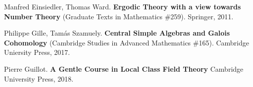 \documentclass[12pt]{article}
\begin{document}
\vfill
\begin{thebibliography}{} 

\item Manfred Einsiedler, Thomas Ward.  \textbf{Ergodic Theory with a view towards Number Theory} (Graduate Texts in Mathematics \#259).  Springer, 2011.

\item Philippe Gille, Tam\'{a}s Szamuely. \textbf{Central Simple Algebras and Galois Cohomology}  (Cambridge Studies in Advanced Mathematics \#165).  Cambridge Uniersity Press, 2017.


\item Pierre Guillot. \textbf{A Gentle Course in Local Class Field Theory} Cambridge University Press, 2018. 


\end{thebibliography}
\end{document}
